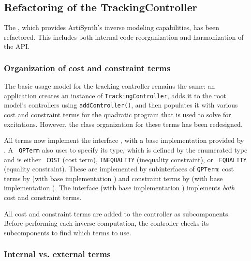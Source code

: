 \documentclass{article}
\begin{document}
\subsection*{Refactoring of the TrackingController}

The , which
provides ArtiSynth's inverse modeling capabilities, has been
refactored. This includes both internal code reorganization and
harmonization of the API.

\subsubsection*{Organization of cost and constraint terms}

The basic usage model for the tracking controller remains the same: an
application creates an instance of 
{\tt TrackingController}, adds it to the root model's controllers
using {\tt addController()}, and then populates it with various cost
and constraint terms for the quadratic program that is used to solve
for excitations.  However, the class organization for these terms has
been redesigned.

All terms now implement the interface
, with a base implementation
provided by .  A {\tt
QPTerm} also uses
 to specify its
type, which is defined by the enumerated type
 and is either {\tt
COST} (cost term), {\tt INEQUALITY} (inequality constraint), or {\tt
EQUALITY} (equality constraint). These are implemented by
subinterfaces of {\tt QPTerm}: cost terms by
 (with base
implementation )
and constraint terms by
 (with base
implementation
).  The
interface  (with
base implementation
) implements
{\it both} cost and constraint terms.

All cost and constraint terms are added to the controller as
subcomponents. Before performing each inverse computation, the
controller checks its subcomponents to find which terms to use.

\subsubsection*{Internal vs. external terms}
\end{document}
